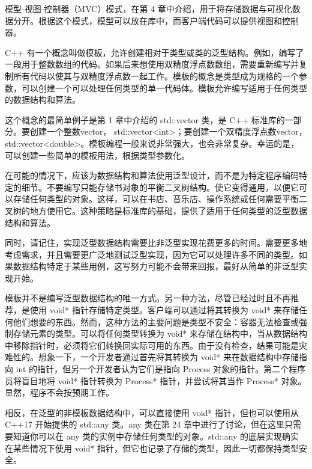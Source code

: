 模型-视图-控制器（MVC）模式，在第 4 章中介绍，用于将存储数据与可视化数据分开。根据这个模式，模型可以放在库中，而客户端代码可以提供视图和控制器。


C++ 有一个概念叫做模板，允许创建相对于类型或类的泛型结构。例如，编写了一段用于整数数组的代码。如果后来想使用双精度浮点数数组，需要重新编写并复制所有代码以使其与双精度浮点数一起工作。模板的概念是类型成为规格的一个参数，可以创建一个可以处理任何类型的单一代码体。模板允许编写适用于任何类型的数据结构和算法。

这个概念的最简单例子是第 1 章中介绍的 std::vector 类，是 C++ 标准库的一部分。要创建一个整数vector， std::vector<int>；要创建一个双精度浮点数vector，std::vector<double>。模板编程一般来说非常强大，也会非常复杂。幸运的是，可以创建一些简单的模板用法，根据类型参数化。

在可能的情况下，应该为数据结构和算法使用泛型设计，而不是为特定程序编码特定的细节。不要编写只能存储书对象的平衡二叉树结构。使它变得通用，以便它可以存储任何类型的对象。这样，可以在书店、音乐店、操作系统或任何需要平衡二叉树的地方使用它。这种策略是标准库的基础，提供了适用于任何类型的泛型数据结构和算法。

同时，请记住，实现泛型数据结构需要比非泛型实现花费更多的时间。需要更多地考虑需求，并且需要更广泛地测试泛型实现，因为它可以处理许多不同的类型。如果数据结构特定于某些用例，这写努力可能不会带来回报，最好从简单的非泛型实现开始。


模板并不是编写泛型数据结构的唯一方式。另一种方法，尽管已经过时且不再推荐，是使用 void* 指针存储特定类型。客户端可以通过将其转换为 void* 来存储任何他们想要的东西。然而，这种方法的主要问题是类型不安全：容器无法检查或强制存储元素的类型。可以将任何类型转换为 void* 来存储在结构中，当从数据结构中移除指针时，必须将它们转换回实际可用的东西。由于没有检查，结果可能是灾难性的。想象一下，一个开发者通过首先将其转换为 void* 来在数据结构中存储指向 int 的指针，但另一个开发者认为它们是指向 Process 对象的指针。第二个程序员将盲目地将 void* 指针转换为 Process* 指针，并尝试将其当作 Process* 对象。显然，程序不会按预期工作。

相反，在泛型的非模板数据结构中，可以直接使用 void* 指针，但也可以使用从 C++17 开始提供的 std::any 类。any 类在第 24 章中进行了讨论，但在这里只需要知道你可以在 any 类的实例中存储任何类型的对象。std::any 的底层实现确实在某些情况下使用 void* 指针，但它也记录了存储的类型，因此一切都保持类型安全。


